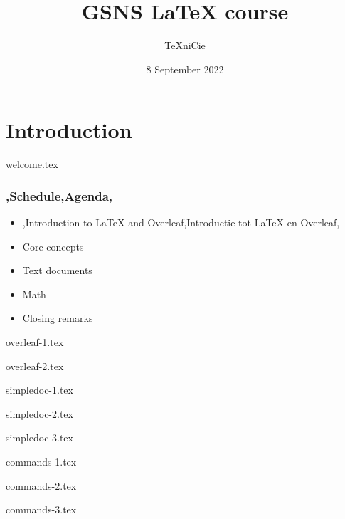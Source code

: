 \documentclass[allauthors]{../../cursuspresentatie}
\title{GSNS \LaTeX{} course}
\author{\TeX niCie}
\date{8 September 2022}
\def\importslide#1#2{%
	{#2}
}
\begin{document}
\section{Introduction}
\importslide{beginners}{welcome.tex}

\begin{frame}
	\frametitle{\lang,Schedule,Agenda,}
	
	\begin{itemize}
		\item \lang,Introduction to LaTeX and Overleaf,Introductie tot LaTeX en Overleaf,
		\item Core concepts
		\item Text documents
		\item Math
		\item Closing remarks
	\end{itemize}
\end{frame}

\importslide{beginners}{overleaf-1.tex}
\importslide{beginners}{overleaf-2.tex}


\importslide{beginners}{simpledoc-1.tex}
\importslide{beginners}{simpledoc-2.tex}
\importslide{beginners}{simpledoc-3.tex}


\importslide{beginners}{commands-1.tex}
\importslide{beginners}{commands-2.tex}
\importslide{beginners}{commands-3.tex}
\end{document}

